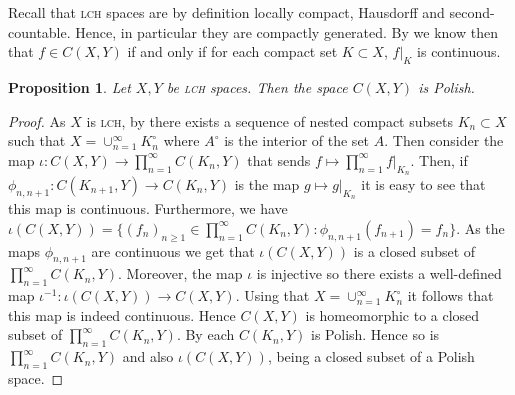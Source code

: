\documentclass[a4paper,12pt,reqno]{amsart}
\newtheorem{proposition}[theorem]{Proposition}
\theoremstyle{definition}
\def\to{\rightarrow}
\begin{document}
Recall that \textsc{lch} spaces are by definition locally compact, Hausdorff and second-countable. Hence, in particular they are compactly generated. By \cite[Lemma 46.4]{Mu} we know then that $f\in C(X,Y)$ if and only if for each compact set $K\subset X$, $f|_K$ is continuous.

\begin{proposition}\label{prop:cont-LCH-polish}
Let $X,Y$ be \textsc{lch} spaces. Then the space $C(X,Y)$ is Polish.
\end{proposition}

\begin{proof}
As $X$ is \textsc{lch}, by \cite[\S 46 Ex. 10. (b)]{Mu} there exists a sequence of nested compact subsets $K_n\subset X$ such that $X=\cup_{n=1}^\infty K_n^\circ$ where $A^\circ$ is the interior of the set $A$. Then consider the map $\iota:C(X,Y)\to \prod_{n=1}^\infty C(K_n,Y)$ that sends $f\mapsto \prod_{n=1}^{\infty} f|_{K_n}$. Then, if $\phi_{n,n+1}:C(K_{n+1},Y)\to C(K_n,Y)$ is the map $g\mapsto g|_{K_n}$ it is easy to see that this map is continuous. Furthermore, we have 
$\iota(C(X,Y))= \{(f_n)_{n\ge 1}\in \prod_{n=1}^\infty C(K_n,Y): \phi_{n,n+1}(f_{n+1})=f_n\}$. As the maps $\phi_{n,n+1}$ are continuous we get that $\iota(C(X,Y))$ is a closed subset of $\prod_{n=1}^\infty C(K_n,Y)$. Moreover, the map $\iota$ is injective so there exists a well-defined map $\iota^{-1}:\iota(C(X,Y))\to C(X,Y)$. Using that $X=\cup_{n=1}^\infty K_n^\circ$ it follows that this map is indeed continuous. Hence $C(X,Y)$ is homeomorphic to a closed subset of $\prod_{n=1}^\infty C(K_n,Y)$. By \cite[Theorem 4.19]{Kechris} each $C(K_n,Y)$ is Polish. Hence so is $\prod_{n=1}^\infty C(K_n,Y)$ and also $\iota(C(X,Y))$, being a closed subset of a Polish space.
\end{proof}
\end{document}
